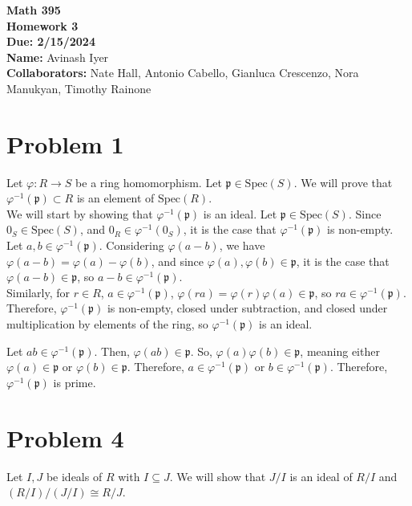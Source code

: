 \documentclass[8pt]{extarticle}
\title{}
\author{}
\date{}
\begin{document}
  \begin{center}
    {\bf \Large Math 395 \\[0.1in]Homework 3 \\[0.1in]
    Due: 2/15/2024}\\[.25in]
    {\bf Name:} {Avinash Iyer}\\[0.15in]
    {\bf Collaborators:} {Nate Hall, Antonio Cabello, Gianluca Crescenzo, Nora Manukyan, Timothy Rainone} \\
  \end{center}
  \section{Problem 1}%
  Let $\varphi: R\rightarrow S$ be a ring homomorphism. Let $\mathfrak{p}\in \text{Spec}(S)$. We will prove that $\varphi^{-1}(\mathfrak{p})\subset R$ is an element of $\text{Spec}(R)$.\\

  We will start by showing that $\varphi^{-1}(\mathfrak{p})$ is an ideal. Let $\mathfrak{p}\in \text{Spec}(S)$. Since $0_{S}\in \text{Spec}(S)$, and $0_R \in \varphi^{-1}(0_S)$, it is the case that $\varphi^{-1}(\mathfrak{p})$ is non-empty.\\

  Let $a,b\in \varphi^{-1}(\mathfrak{p})$. Considering $\varphi(a-b)$, we have $\varphi(a-b) = \varphi(a)-\varphi(b)$, and since $\varphi(a),\varphi(b)\in \mathfrak{p}$, it is the case that $\varphi(a-b)\in \mathfrak{p}$, so $a-b\in \varphi^{-1}(\mathfrak{p})$.\\

  Similarly, for $r\in R$, $a\in \varphi^{-1}(\mathfrak{p})$, $\varphi(ra) = \varphi(r)\varphi(a)\in \mathfrak{p}$, so $ra \in \varphi^{-1}(\mathfrak{p})$. Therefore, $\varphi^{-1}(\mathfrak{p})$ is non-empty, closed under subtraction, and closed under multiplication by elements of the ring, so $\varphi^{-1}(\mathfrak{p})$ is an ideal.

  Let $ab\in \varphi^{-1}(\mathfrak{p})$. Then, $\varphi(ab)\in \mathfrak{p}$. So, $\varphi(a)\varphi(b)\in \mathfrak{p}$, meaning either $\varphi(a)\in \mathfrak{p}$ or $\varphi(b)\in \mathfrak{p}$. Therefore, $a\in \varphi^{-1}(\mathfrak{p})$ or $b\in \varphi^{-1}(\mathfrak{p})$. Therefore, $\varphi^{-1}(\mathfrak{p})$ is prime.
  \section{Problem 4}%
  Let $I,J$ be ideals of $R$ with $I\subseteq J$. We will show that $J/I$ is an ideal of $R/I$ and $(R/I)/(J/I)\cong R/J$.\\
\end{document}
